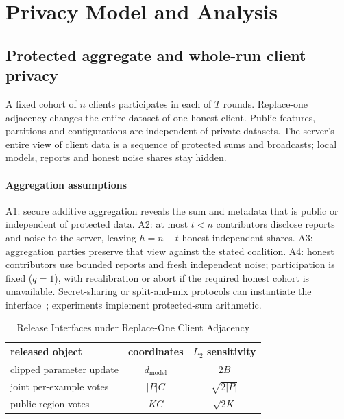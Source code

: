 \section{Privacy Model and Analysis}
\label{sec:threat}
\label{sec:threat:setting}

\subsection{Protected aggregate and whole-run client privacy}

A fixed cohort of $n$ clients participates in each of $T$ rounds. Replace-one
adjacency changes the entire dataset of one honest client. Public features,
partitions and configurations are independent of private datasets. The
server's entire view of client data is a sequence of protected sums and
broadcasts; local models, reports and honest noise shares stay hidden.

\paragraph{Aggregation assumptions}
A1: secure additive aggregation reveals the sum and metadata that is public or
independent of protected data. A2: at most $t<n$ contributors disclose reports
and noise to the server, leaving $h=n-t$ honest independent shares.
A3: aggregation parties preserve that view against the stated coalition.
A4: honest contributors use bounded reports and fresh independent noise;
participation is fixed ($q=1$), with recalibration or abort if the required
honest cohort is unavailable. Secret-sharing or split-and-mix protocols can
instantiate the interface~\cite{bonawitz2017practical,corriganGibbs2017prio,ishai2006cryptography};
experiments implement protected-sum arithmetic.

\begin{table}[t]
\caption{Release Interfaces under Replace-One Client Adjacency}
\label{tab:release-interfaces}\small
\centering
\begin{tabular}{@{}lcc@{}}\toprule
released object & coordinates & $L_2$ sensitivity \\\midrule
clipped parameter update & $d_{\mathrm{model}}$ & $2B$ \\
joint per-example votes & $|P|C$ & $\sqrt{2|P|}$ \\
public-region votes & $KC$ & $\sqrt{2K}$ \\
\bottomrule\end{tabular}
\end{table}

